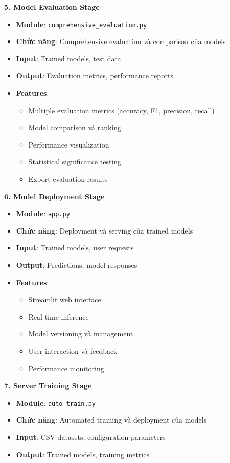 \textbf{5. Model Evaluation Stage}
\begin{itemize}
    \item \textbf{Module}: \texttt{comprehensive\_evaluation.py}
    \item \textbf{Chức năng}: Comprehensive evaluation và comparison của models
    \item \textbf{Input}: Trained models, test data
    \item \textbf{Output}: Evaluation metrics, performance reports
    \item \textbf{Features}:
        \begin{itemize}
            \item Multiple evaluation metrics (accuracy, F1, precision, recall)
            \item Model comparison và ranking
            \item Performance visualization
            \item Statistical significance testing
            \item Export evaluation results
        \end{itemize}
\end{itemize}

\textbf{6. Model Deployment Stage}
\begin{itemize}
    \item \textbf{Module}: \texttt{app.py}
    \item \textbf{Chức năng}: Deployment và serving của trained models
    \item \textbf{Input}: Trained models, user requests
    \item \textbf{Output}: Predictions, model responses
    \item \textbf{Features}:
        \begin{itemize}
            \item Streamlit web interface
            \item Real-time inference
            \item Model versioning và management
            \item User interaction và feedback
            \item Performance monitoring
        \end{itemize}
\end{itemize}

\textbf{7. Server Training Stage}
\begin{itemize}
    \item \textbf{Module}: \texttt{auto\_train.py}
    \item \textbf{Chức năng}: Automated training và deployment của models
    \item \textbf{Input}: CSV datasets, configuration parameters
    \item \textbf{Output}: Trained models, training metrics
\end{itemize}

